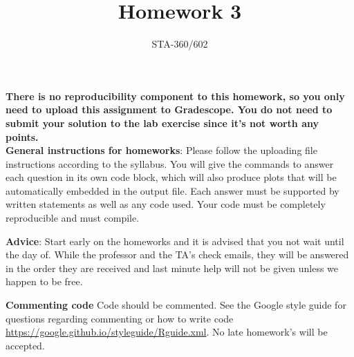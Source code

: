 \documentclass{article}
\begin{document}
\title{Homework 3}
\author{STA-360/602}
\date{}
\maketitle

\textbf{There is no reproducibility component to this homework, so you only need to upload this assignment to Gradescope. You do not need to submit your solution to the lab exercise since it's not worth any points.}\\

\textbf{General instructions for homeworks}: Please follow the uploading file instructions according to the syllabus. You will give the commands to answer each question in its own code block, which will also produce plots that will be automatically embedded in the output file. Each answer must be supported by written statements as well as any code used. Your code must be completely reproducible and must compile. 

\textbf{Advice}: Start early on the homeworks and it is advised that you not wait until the day of. While the professor and the TA's check emails, they will be answered in the order they are received and last minute help will not be given unless we happen to be free.  

\textbf{Commenting code}
Code should be commented. See the Google style guide for questions regarding commenting or how to write 
code \url{https://google.github.io/styleguide/Rguide.xml}. No late homework's will be accepted.


\end{document}
